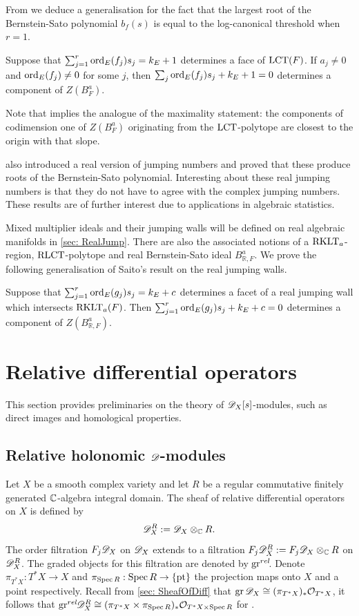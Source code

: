 From  we deduce a generalisation for the fact that the largest root of the Bernstein-Sato polynomial $b_f(s)$ is equal to the log-canonical threshold when $r=1$.
\begin{corollary}\label{thm: LCT}
  Suppose that $\sum_{j=1}^r \operatorname{ord}_E(f_j)s_j = k_E + 1$ determines a face of $\operatorname{LCT}(F)$. If $a_j\neq 0$ and $\operatorname{ord}_{E}(f_j)\neq 0$ for some $j$, then $\sum_j \operatorname{ord}_{E}(f_j)s_j +k_E + 1=0$ determines a component of $Z(B_F^a)$.
\end{corollary}
Note that  implies the analogue of the maximality statement: the components of codimension one of $Z(B_F^a)$ originating from the $\operatorname{LCT}$-polytope are closest to the origin with that slope.

\cite{RealLogCan} also introduced a real version of jumping numbers and proved that these produce roots of the Bernstein-Sato polynomial.
Interesting about these real jumping numbers is that they do not have to agree with the complex jumping numbers.
These results are of further interest due to applications in algebraic statistics.

Mixed multiplier ideals and their jumping walls will be defined on real algebraic manifolds in \cref{sec: RealJump}.
There are also the associated notions of a $\operatorname{RKLT}_a$-region,  $\operatorname{RLCT}$-polytope and real Bernstein-Sato ideal $B_{\mathbb{R},F}^a$.
We prove the following generalisation of Saito's result on the real jumping walls.
\begin{theorem}
  Suppose that $\sum_{j=1}^r \operatorname{ord}_E(g_j)s_j = k_E + c$ determines a facet of a real jumping wall which intersects $\operatorname{RKLT}_{a}(F)$.
  Then $\sum_{j=1}^r \operatorname{ord}_E(g_j)s_j + k_E + c = 0$ determines a component of $Z(B_{\mathbb{R},F}^a)$.
\end{theorem}

\section{Relative differential operators}\label{sec: DXS}
This section provides preliminaries on the theory of $\mathscr{D}_X[s]$-modules, such as direct images and homological properties.

\subsection{Relative holonomic $\mathscr{D}$-modules}\label{sec: RelHol}
Let $X$ be a smooth complex variety and let $R$ be a regular commutative finitely generated $\mathbb{C}$-algebra integral domain. The sheaf of relative differential operators on $X$ is defined by
$$\mathscr{D}_X^R := \mathscr{D}_X \otimes_{\mathbb{C}} R.$$
The order filtration $F_j \mathscr{D}_X$ on $\mathscr{D}_X$ extends to a filtration $F_j \mathscr{D}_X^R := F_j\mathscr{D}_X\otimes_{\mathbb{C}} R$ on $\mathscr{D}_X^R$.
The graded objects for this filtration are denoted by $\operatorname{gr}^{rel}\mkern-5mu$.
Denote $\pi_{T^*X}:T^*X \to X$ and $\pi_{\operatorname{Spec} R}: \operatorname{Spec} R \to \{\operatorname{pt}\}$ the projection maps onto $X$ and a point respectively.
Recall from \cref{sec: SheafOfDiff} that $\operatorname{gr}\mathscr{D}_X \cong (\pi_{T^*X})_* \mathcal{O}_{T^*X}$, it follows that $\operatorname{gr}^{rel}\mkern-5mu\mathscr{D}_X^R \cong (\pi_{T^* X}\times \pi_{\operatorname{Spec} R})_*\mathcal{O}_{T^*X\times \operatorname{Spec} R}$ for .


